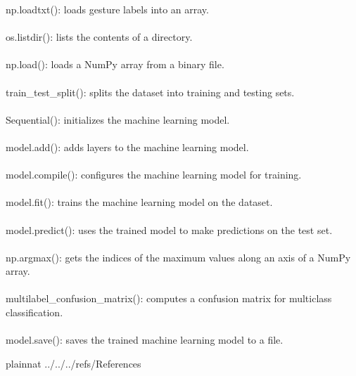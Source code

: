 \documentclass[12pt, titlepage]{article}
\begin{document}
np.loadtxt(): loads gesture labels into an array.\\
\\
os.listdir(): lists the contents of a directory.\\
\\
np.load(): loads a NumPy array from a binary file.\\
\\
train\_test\_split(): splits the dataset into training and testing sets.\\
\\
Sequential(): initializes the machine learning model.\\
\\
model.add(): adds layers to the machine learning model.\\
\\
model.compile(): configures the machine learning model for training.\\
\\
model.fit(): trains the machine learning model on the dataset.\\
\\
model.predict(): uses the trained model to make predictions on the test set.\\
\\
np.argmax(): gets the indices of the maximum values along an axis of a NumPy array.\\
\\
multilabel\_confusion\_matrix(): computes a confusion matrix for multiclass classification.\\
\\
model.save(): saves the trained machine learning model to a file.\\

\newpage

 {plainnat}
 {../../../refs/References}
\end{document}
